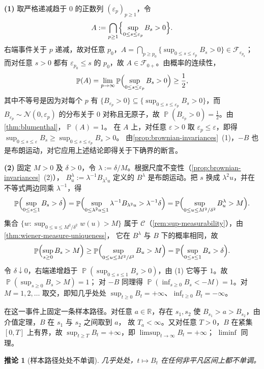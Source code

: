 \documentclass[UTF8,11pt,a4paper,oneside,fontset=fandol]{ctexrep}
\makeatletter
\numberwithin{equation}{section}
\theoremstyle{zhthm}
\newtheorem{corollary}[theorem]{推论}
\renewenvironment{proof}[1][\proofname]{\par
  \pushQED{\qed}%
  \normalfont\topsep6\p@\@plus6\p@\relax
  \trivlist
  \item[\hskip\labelsep\bfseries#1\hspace{0.5em}]\ignorespaces
}{%
  \popQED\endtrivlist\@endpefalse
}
\renewcommand{\proofname}{证明}
\newcommand{\R}{\mathbb{R}}
\newcommand{\F}{\mathcal{F}}
\DeclareMathOperator{\Prob}{\mathbb{P}}
\newcommand{\Normal}{\mathcal{N}}
\makeatother
\begin{document}
\begin{proof}
\textbf{(1)} 取严格递减趋于 $0$ 的正数列 $(\varepsilon_p)_{p\ge1}$，令
\[
  A:=\bigcap_{p\ge1}\Bigl\{\sup_{0\le s\le\varepsilon_p}B_s>0\Bigr\}.
\]
右端事件关于 $p$ 递减，故对任意 $p_0$，$A=\bigcap_{p\ge p_0}\{\sup_{0\le s\le\varepsilon_p}B_s>0\}\in\F_{\varepsilon_{p_0}}$；
而对任意 $s>0$ 都有 $\varepsilon_{p_0}\le s$ 的 $p_0$，故 $A\in\F_{0+}$。由概率的连续性，
\[
  \Prob(A)=\lim_{p\to\infty}\Prob\Bigl(\sup_{0\le s\le\varepsilon_p}B_s>0\Bigr)\ge\frac12,
\]
其中不等号是因为对每个 $p$ 有 $\{B_{\varepsilon_p}>0\}\subseteq\{\sup_{0\le s\le\varepsilon_p}B_s>0\}$，而 $B_{\varepsilon_p}\sim\Normal(0,\varepsilon_p)$ 的分布关于 $0$ 对称且无原子，故 $\Prob(B_{\varepsilon_p}>0)=\frac12$。由\cref{thm:blumenthal}，$\Prob(A)=1$。
在 $A$ 上，对任意 $\varepsilon>0$ 取 $\varepsilon_p\le\varepsilon$，即得 $\sup_{0\le s\le\varepsilon}B_s\ge\sup_{0\le s\le\varepsilon_p}B_s>0$。
由\cref{prop:brownian-invariances}~(1)，$-B$ 也是布朗运动，对它应用上述结论即得关于下确界的断言。

\textbf{(2)} 固定 $M>0$ 及 $\delta>0$，令 $\lambda:=\delta/M$。根据尺度不变性（\cref{prop:brownian-invariances}~(2)），
$B^\lambda_u:=\lambda^{-1}B_{\lambda^2u}$ 定义的 $B^\lambda$ 是布朗运动。把 $s$ 换成 $\lambda^2u$，并在不等式两边同乘 $\lambda^{-1}$，得
\[
  \Prob\Bigl(\sup_{0\le s\le1}B_s>\delta\Bigr)
  =\Prob\Bigl(\sup_{0\le\lambda^2u\le1}\lambda^{-1}B_{\lambda^2u}>\lambda^{-1}\delta\Bigr)
  =\Prob\Bigl(\sup_{0\le u\le M^2/\delta^2}B^\lambda_u>M\Bigr).
\]
集合 $\{w:\sup_{0\le u\le M^2/\delta^2}w(u)>M\}$ 属于 $\mathscr C$（\cref{rem:sup-measurability}），由\cref{thm:wiener-measure-uniqueness}，
它在 $B^\lambda$ 与 $B$ 下的概率相同，故
\[
  \Prob\Bigl(\sup_{s\ge0}B_s>M\Bigr)\ge\Prob\Bigl(\sup_{0\le u\le M^2/\delta^2}B_u>M\Bigr)=\Prob\Bigl(\sup_{0\le s\le1}B_s>\delta\Bigr).
\]
令 $\delta\downarrow0$，右端递增趋于 $\Prob(\sup_{0\le s\le1}B_s>0)$，由 (1) 它等于 $1$。故 $\Prob(\sup_{s\ge0}B_s>M)=1$；
对 $-B$ 同理得 $\Prob(\inf_{s\ge0}B_s<-M)=1$。对 $M=1,2,\ldots$ 取交，即知几乎处处 $\sup_{t\ge0}B_t=+\infty$、$\inf_{t\ge0}B_t=-\infty$。

在这一事件上固定一条样本路径。对任意 $a\in\R$，存在 $s_1,s_2$ 使 $B_{s_1}>a>B_{s_2}$，由介值定理，$B$ 在 $s_1$ 与 $s_2$ 之间取到 $a$，
故 $T_a<\infty$。又对任意 $T>0$，$B$ 在紧集 $[0,T]$ 上有界，故 $\sup_{t\ge T}B_t=+\infty$，即 $\limsup_{t\to\infty}B_t=+\infty$；
$\liminf$ 同理。
\end{proof}

\begin{corollary}[样本路径处处不单调]
\label{cor:brownian-not-monotone}
几乎处处，$t\mapsto B_t$ 在任何非平凡区间上都不单调。
\end{corollary}
\end{document}
